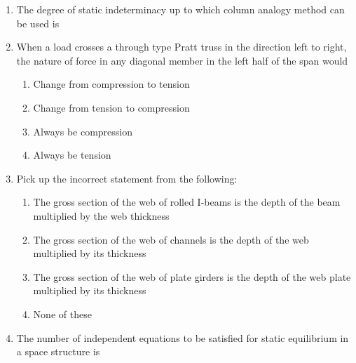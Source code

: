 \documentclass[11pt,a4paper]{article}
\begin{document}
\begin{enumerate}
\\
\item{The degree of static indeterminacy up to which column analogy method can be used is}
\\
\item{When a load crosses a through type Pratt truss in the direction left to right, the nature of force in any diagonal member in the left half of the span would}
\begin{enumerate}[label=\Alph*.]
\item{Change from compression to tension}
\item{Change from tension to compression}
\item{Always be compression}
\item{Always be tension}
\end{enumerate}
\item{Pick up the incorrect statement from the following:}
\begin{enumerate}[label=\Alph*.]
\item{The gross section of the web of rolled I-beams is the depth of the beam multiplied by the web thickness}
\item{The gross section of the web of channels is the depth of the web multiplied by its thickness}
\item{The gross section of the web of plate girders is the depth of the web plate multiplied by its thickness}
\item{None of these}
\end{enumerate}
\item{The number of independent equations to be satisfied for static equilibrium in a space structure is}
\\
\end{enumerate}
\end{document}
